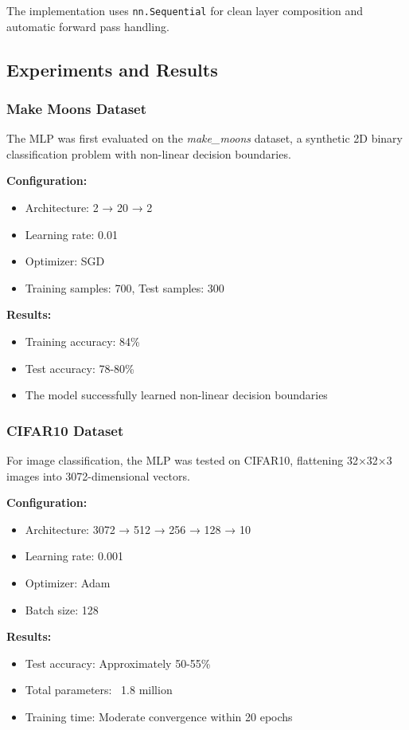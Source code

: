 \documentclass[11pt,a4paper]{article}
\begin{document}
The implementation uses \texttt{nn.Sequential} for clean layer composition and automatic forward pass handling.

\subsection{Experiments and Results}

\subsubsection{Make Moons Dataset}

The MLP was first evaluated on the \textit{make\_moons} dataset, a synthetic 2D binary classification problem with non-linear decision boundaries.

\textbf{Configuration:}
\begin{itemize}
    \item Architecture: 2 → 20 → 2
    \item Learning rate: 0.01
    \item Optimizer: SGD
    \item Training samples: 700, Test samples: 300
\end{itemize}

\textbf{Results:}
\begin{itemize}
    \item Training accuracy: 84\%
    \item Test accuracy: 78-80\%
    \item The model successfully learned non-linear decision boundaries
\end{itemize}

\subsubsection{CIFAR10 Dataset}

For image classification, the MLP was tested on CIFAR10, flattening 32×32×3 images into 3072-dimensional vectors.

\textbf{Configuration:}
\begin{itemize}
    \item Architecture: 3072 → 512 → 256 → 128 → 10
    \item Learning rate: 0.001
    \item Optimizer: Adam
    \item Batch size: 128
\end{itemize}

\textbf{Results:}
\begin{itemize}
    \item Test accuracy: Approximately 50-55\%
    \item Total parameters: ~1.8 million
    \item Training time: Moderate convergence within 20 epochs
\end{itemize}
\end{document}

